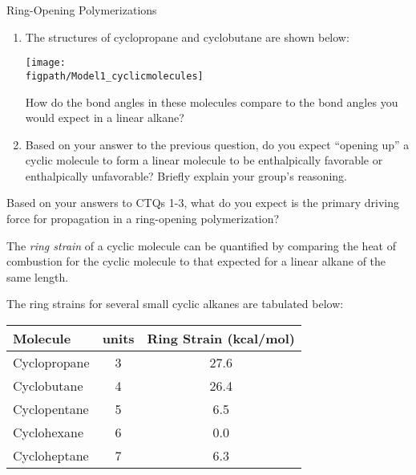 \begin{activity}{Ring-Opening Polymerizations}
\begin{ctqs}
\begin{enumerate}
			\item The structures of cyclopropane and cyclobutane are shown below:
			
				\centerline{\texttt{[image: \\figpath/Model1\_cyclicmolecules]}}
				
				How do the bond angles in these molecules compare to the bond angles you would expect in a linear alkane?
			
				\begin{solution}[2in]
				\end{solution}
				
			\item Based on your answer to the previous question, do you expect ``opening up'' a cyclic molecule to form a linear molecule to be enthalpically favorable or enthalpically unfavorable?  Briefly explain your group's reasoning.
			
				\begin{solution}[1in]
				\end{solution}
			
		\end{enumerate}
		
	\question Based on your answers to CTQs 1-3, what do you expect is the primary driving force for propagation in a ring-opening polymerization?
			
				\begin{solution}[0.75in]
				\end{solution}

\end{ctqs}

\begin{infobox}

	The \emph{ring strain} of a cyclic molecule can be quantified by comparing the heat of combustion for the cyclic molecule to that expected for a linear alkane of the same length.
	
	The ring strains for several small cyclic alkanes are tabulated below:
	\begin{center}
	\begin{tabular}{lcc}
		\hline		
		Molecule & \ce{CH2} units & Ring Strain (kcal/mol)\\\hline
		Cyclopropane & 3 & 27.6\\
		Cyclobutane & 4 & 26.4\\
		Cyclopentane & 5 & 6.5\\
		Cyclohexane & 6 & 0.0\\
		Cycloheptane & 7 & 6.3\\
	\end{tabular}
	\end{center}


\end{infobox}
\end{activity}
